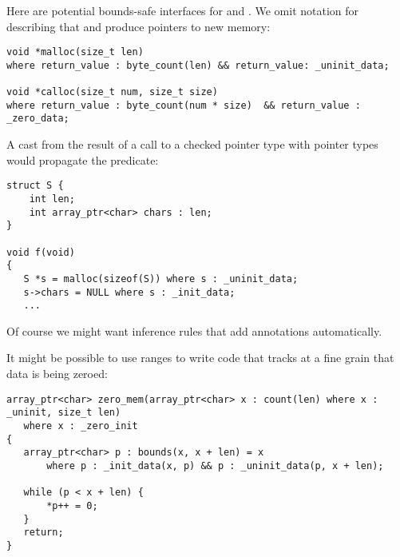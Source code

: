 Here are potential bounds-safe interfaces for  and .
We omit notation for describing that  and  produce 
pointers to new memory:
\begin{lstlisting}
void *malloc(size_t len) 
where return_value : byte_count(len) && return_value: _uninit_data;

void *calloc(size_t num, size_t size)
where return_value : byte_count(num * size)  && return_value : _zero_data;
\end{lstlisting}
A cast from the result of a  call to a checked pointer type with pointer types
would propagate the   predicate:
\begin{lstlisting}
struct S {
    int len;
    int array_ptr<char> chars : len;
}

void f(void) 
{
   S *s = malloc(sizeof(S)) where s : _uninit_data;
   s->chars = NULL where s : _init_data;
   ...
\end{lstlisting}
Of course we might want inference rules that add annotations automatically.  

It might be possible to use ranges to write code that tracks at a fine grain that 
data is being zeroed:
\begin{lstlisting}
array_ptr<char> zero_mem(array_ptr<char> x : count(len) where x : _uninit, size_t len) 
   where x : _zero_init
{
   array_ptr<char> p : bounds(x, x + len) = x
       where p : _init_data(x, p) && p : _uninit_data(p, x + len);
       
   while (p < x + len) { 
       *p++ = 0;
   }
   return;
}
\end{lstlisting}